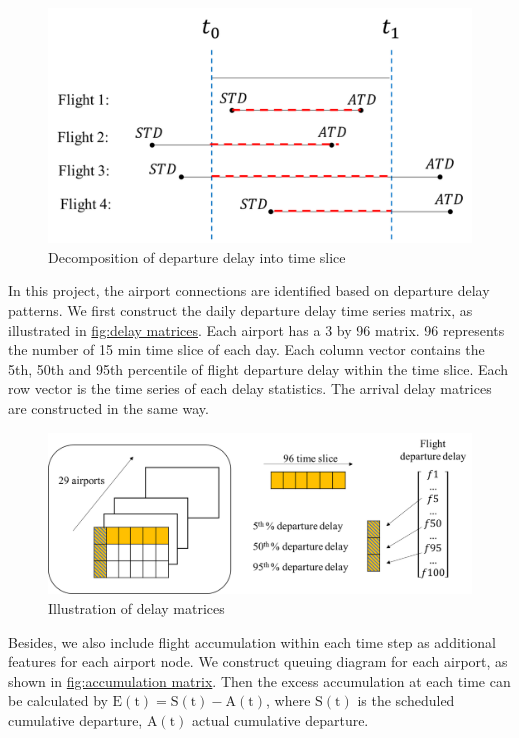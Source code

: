 \begin{figure}[thbp]
    \label{fig:delay decompose}
    \centering
    \includegraphics[width=\textwidth]{img/delay decompose.png}
    \caption{Decomposition of departure delay into time slice}
\end{figure}

In this project, the airport connections are identified based on departure delay patterns. We first construct the daily departure delay time series matrix, as illustrated in \hyperref[fig:delay matrices]{fig:delay matrices}.  Each airport has a 3 by 96 matrix. 96 represents the number of 15 min time slice of each day. Each column vector contains the 5th, 50th and 95th percentile of flight departure delay within the time slice. Each row vector is the time series of each delay statistics. The arrival delay matrices are constructed in the same way. 
\begin{figure}[thbp]
    \label{fig:delay matrices}
    \centering
    \includegraphics[width=\textwidth]{img/delay matrices.png}
    \caption{Illustration of delay matrices}
\end{figure}

Besides, we also include flight accumulation within each time step as additional features for each airport node. We construct queuing diagram for each airport, as shown in \hyperref[fig:accumulation matrix]{fig:accumulation matrix}. Then the excess accumulation at each time can be calculated by $\mathrm{E(t)}=\mathrm{S(t)}-\mathrm{A(t)}$, where $\mathrm{S(t)}$ is the scheduled cumulative departure, $\mathrm{A(t)}$ actual cumulative departure.

